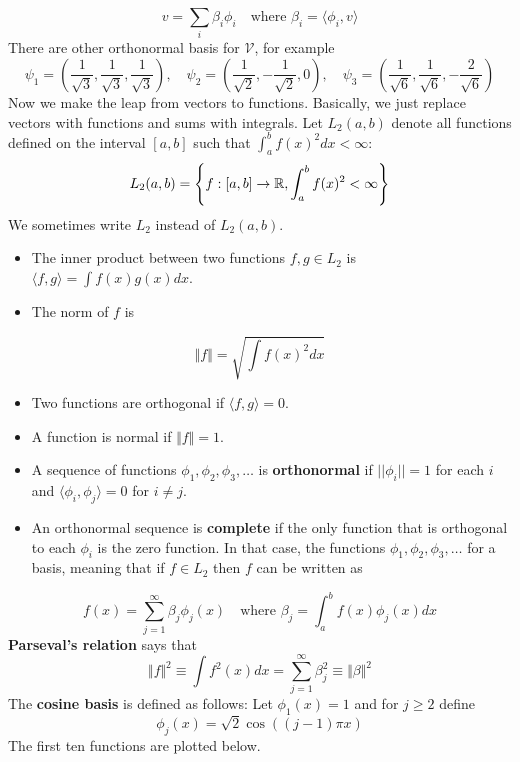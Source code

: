 \[
v = \sum_{i} \beta_{i} \phi_{i}
\quad \text{where } \beta_{i} = \langle \phi_{i}, v \rangle
\]
There are other orthonormal basis for \(\mathcal{V}\), for example
\[
\psi_{1} = \left( \frac{1}{\sqrt{3}}, \frac{1}{\sqrt{3}} , \frac{1}{\sqrt{3}} \right),
\quad
\psi_{2} = \left( \frac{1}{\sqrt{2}}, -\frac{1}{\sqrt{2}} , 0 \right),
\quad
\psi_{3} = \left( \frac{1}{\sqrt{6}}, \frac{1}{\sqrt{6}} , -\frac{2}{\sqrt{6}} \right)
\]
Now we make the leap from vectors to functions. Basically, we just
replace vectors with functions and sums with integrals.
Let \(L_{2}(a, b)\) denote all functions defined on the interval
\([a, b]\) such that \(\int_a^{b} f(x)^{2} dx < \infty\):
\[
L_{2}(a, b) = \left\{ f: [a, b] \rightarrow \R , \int_a^{b} f(x)^{2} < \infty \right\}
\]
We sometimes write \(L_{2}\) instead of \(L_{2}(a, b)\).
\begin{itemize}[tightlist]
\item
  The inner product between two functions \(f, g \in L_{2}\) is
  \(\langle f, g \rangle = \int f(x) g(x) dx\).
\item
  The norm of \(f\) is
\end{itemize}
\[
\Vert f \Vert = \sqrt{\int f(x)^{2} dx}
\]
\begin{itemize}[tightlist]
\item
  Two functions are orthogonal if \(\langle f, g \rangle = 0\).
\item
  A function is normal if \(\Vert f \Vert = 1\).
\item
  A sequence of functions \(\phi_{1}, \phi_{2}, \phi_{3}, \dots\) is
  \textbf{orthonormal} if \(|| \phi_{i} || = 1\) for each \(i\) and
  \(\langle \phi_{i}, \phi_{j} \rangle = 0\) for \(i \neq j\).
\item
  An orthonormal sequence is \textbf{complete} if the only function that
  is orthogonal to each \(\phi_{i}\) is the zero function. In that case,
  the functions \(\phi_{1}, \phi_{2}, \phi_{3}, \dots\) for a basis, meaning
  that if \(f \in L_{2}\) then \(f\) can be written as
\end{itemize}
\[
f(x) = \sum_{j=1}^{\infty} \beta_{j} \phi_{j}(x)
\quad \text{where } \beta_{j} = \int_a^{b} f(x) \phi_{j}(x) dx
\]
\textbf{Parseval's relation} says that
\[
\Vert f \Vert^{2} \equiv \int f^{2}(x) dx = \sum_{j=1}^{\infty} \beta_{j}^{2} \equiv \Vert \beta \Vert^{2}
\]
The \textbf{cosine basis} is defined as follows: Let \(\phi_{1}(x) = 1\)
and for \(j \geq 2\) define
\[
\phi_{j}(x) = \sqrt{2} \cos \left( (j - 1) \pi x\right)
\]
The first ten functions are plotted below.

